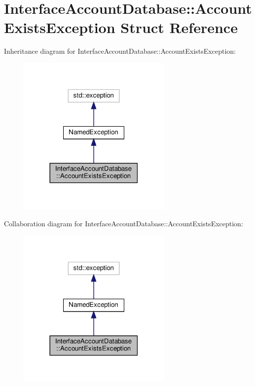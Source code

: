 \hypertarget{structInterfaceAccountDatabase_1_1AccountExistsException}{}\section{Interface\+Account\+Database\+:\+:Account\+Exists\+Exception Struct Reference}
\label{structInterfaceAccountDatabase_1_1AccountExistsException}


Inheritance diagram for Interface\+Account\+Database\+:\+:Account\+Exists\+Exception\+:\nopagebreak
\begin{figure}[H]
\begin{center}
\leavevmode
\includegraphics[width=213pt]{d2/d3f/structInterfaceAccountDatabase_1_1AccountExistsException__inherit__graph}
\end{center}
\end{figure}


Collaboration diagram for Interface\+Account\+Database\+:\+:Account\+Exists\+Exception\+:\nopagebreak
\begin{figure}[H]
\begin{center}
\leavevmode
\includegraphics[width=213pt]{d1/d39/structInterfaceAccountDatabase_1_1AccountExistsException__coll__graph}
\end{center}
\end{figure}
